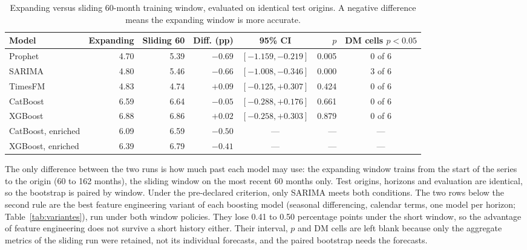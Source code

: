 \begin{table}[htbp]
\centering
\small
\setlength{\tabcolsep}{4pt}
\caption{Expanding versus sliding 60-month training window, evaluated on identical
test origins. A negative difference means the expanding window is more accurate.}
\label{tab:janela}
\begin{tabular}{lrrrcrc}
\toprule
Model & Expanding & Sliding 60 & Diff. (pp) & 95\% CI & $p$ & DM cells $p<0.05$ \\
\midrule
Prophet & 4.70 & 5.39 & $-0.69$ & $[-1.159, -0.219]$ & 0.005 & 0 of 6 \\
SARIMA & 4.80 & 5.46 & $-0.66$ & $[-1.008, -0.346]$ & 0.000 & 3 of 6 \\
TimesFM & 4.83 & 4.74 & $+0.09$ & $[-0.125, +0.307]$ & 0.424 & 0 of 6 \\
CatBoost & 6.59 & 6.64 & $-0.05$ & $[-0.288, +0.176]$ & 0.661 & 0 of 6 \\
XGBoost & 6.88 & 6.86 & $+0.02$ & $[-0.258, +0.303]$ & 0.879 & 0 of 6 \\
\midrule
CatBoost, enriched & 6.09 & 6.59 & $-0.50$ & --- & --- & --- \\
XGBoost, enriched & 6.39 & 6.79 & $-0.41$ & --- & --- & --- \\
\bottomrule
\end{tabular}

\vspace{0.5em}
\begin{minipage}{\textwidth}
\footnotesize
The only difference between the two runs is how much past each model may use: the
expanding window trains from the start of the series to the origin (60 to 162 months),
the sliding window on the most recent 60 months only. Test origins, horizons and
evaluation are identical, so the bootstrap is paired by window. Under the pre-declared
criterion, only SARIMA meets both conditions. The two rows below the second rule are the best feature engineering variant of each boosting model (seasonal differencing, calendar terms, one model per horizon; Table~\ref{tab:variantes}), run under both window policies. They lose 0.41 to 0.50 percentage points under the short window, so the advantage of feature engineering does not survive a short history either. Their interval, $p$ and DM cells are left blank because only the aggregate metrics of the sliding run were retained, not its individual forecasts, and the paired bootstrap needs the forecasts.
\end{minipage}
\end{table}
